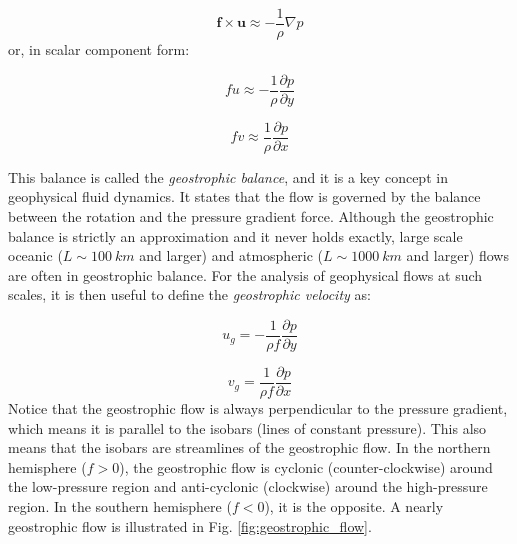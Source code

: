 \documentclass[12pt]{article}
\numberwithin{equation}{section}
\numberwithin{figure}{section}
\numberwithin{table}{section}
\begin{document}
\begin{equation}
  \mathbf{f} \times \mathbf{u} \approx - \frac{1}{\rho} \nabla p
\end{equation}
or, in scalar component form:

\begin{equation}
  f u \approx - \frac{1}{\rho} \frac{\partial p}{\partial y}
\end{equation}

\begin{equation}
  f v \approx \frac{1}{\rho} \frac{\partial p}{\partial x}
\end{equation}

This balance is called the
\textit{geostrophic balance},
and it is a key concept in geophysical fluid dynamics.
It states that the flow is governed by the balance between the rotation and the
pressure gradient force.
Although the geostrophic balance is strictly an approximation and it never holds
exactly, large scale oceanic ($L \sim 100\ km$ and larger) and atmospheric
($L \sim 1000\ km$ and larger) flows are often in geostrophic balance.
For the analysis of geophysical flows at such scales, it is then useful to
define the \textit{geostrophic velocity} as:

\begin{equation}
  u_g = - \frac{1}{\rho f} \frac{\partial p}{\partial y}
  \label{eq:geostrophic_velocity_u}
\end{equation}

\begin{equation}
  v_g = \frac{1}{\rho f} \frac{\partial p}{\partial x}
  \label{eq:geostrophic_velocity_v}
\end{equation}
Notice that the geostrophic flow is always perpendicular to the pressure gradient,
which means it is parallel to the isobars (lines of constant pressure).
This also means that the isobars are streamlines of the geostrophic flow.
In the northern hemisphere ($f > 0$), the geostrophic flow is cyclonic
(counter-clockwise) around the low-pressure region and anti-cyclonic
(clockwise) around the high-pressure region.
In the southern hemisphere ($f < 0$), it is the opposite.
A nearly geostrophic flow is illustrated in Fig. \ref{fig:geostrophic_flow}.
\end{document}

